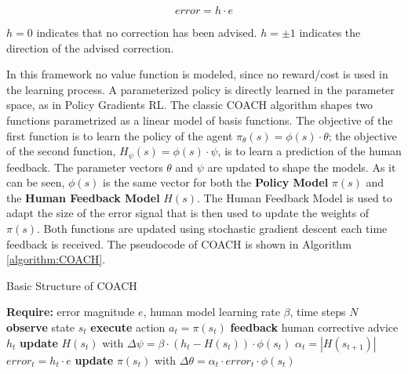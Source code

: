 \begin{equation}\label{eq:error}
    error=h \cdot e
\end{equation}

$h=0$ indicates that no correction has been advised. $h=\pm 1$ indicates the direction of the advised correction.

In this framework no value function is modeled, since no reward/cost is used in the learning process. A parameterized policy is directly learned in the parameter space, as in Policy Gradients RL. 
The classic COACH algorithm shapes two functions parametrized as a linear model of basis functions. The objective of the first function is to learn the policy of the agent $\pi_{\theta}(s)=\phi(s) \cdot \theta$; the objective of the second function, $H_{\psi}(s)=\phi(s) \cdot \psi$, is to learn a prediction of the human feedback. The parameter vectors $\theta$ and $\psi$ are updated to shape the models. As it can be seen, $\phi(s)$ is the same vector for both the \textbf{Policy Model} $\pi(s)$ and the \textbf{Human Feedback Model}  $H(s)$. The Human Feedback Model is used to adapt the size of the error signal that is then used to update the weights of $\pi(s)$. Both functions are updated using stochastic gradient descent each time feedback is received. The pseudocode of COACH is shown in Algorithm \ref{algorithm:COACH}.

\begin{algorithm}[H]
\caption{Basic Structure of COACH}\label{algorithm:COACH}
\begin{algorithmic}[1]
\State \textbf{Require:} error magnitude $e$, human model learning rate $\beta$, time steps $N$
\State \textbf{observe} state $s_{t}$
\State \textbf{execute} action $a_{t}=\pi(s_{t})$
\State \textbf{feedback} human corrective advice $h_{t}$
\State \textbf{update} $H(s_{t})$ with $\Delta \psi = \beta\cdot (h_{t}-H(s_{t}))\cdot \phi(s_{t})$
\State $\alpha_{t} = |H(s_{t+1})|$
\State $error_{t} = h_{t}\cdot e$
\State \textbf{update} $\pi(s_{t})$ with $\Delta \theta = \alpha_{t} \cdot error_{t} \cdot \phi(s_{t})$
\EndIf
\EndFor
\end{algorithmic}
\end{algorithm}